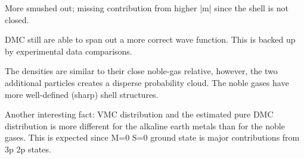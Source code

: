  More smushed out; missing contribution from higher |m| since the shell is not closed. 
 
 DMC still are able to span out a more correct wave function. This is backed up by experimental data comparisons. 
 
 The densities are similar to their close noble-gas relative, however, the two additional particles creates a disperse probability cloud. The noble gases have more well-defined (sharp) shell structures.
 
 Another interesting fact: VMC distribution and the estimated pure DMC distribution is more different for the alkaline earth metals than for the noble gases. This is expected since M=0 S=0 ground state is major contributions from 3p 2p states. 
 
 
\begin{figure}
 \begin{center}
     \\

\end{center}
\end{figure}
